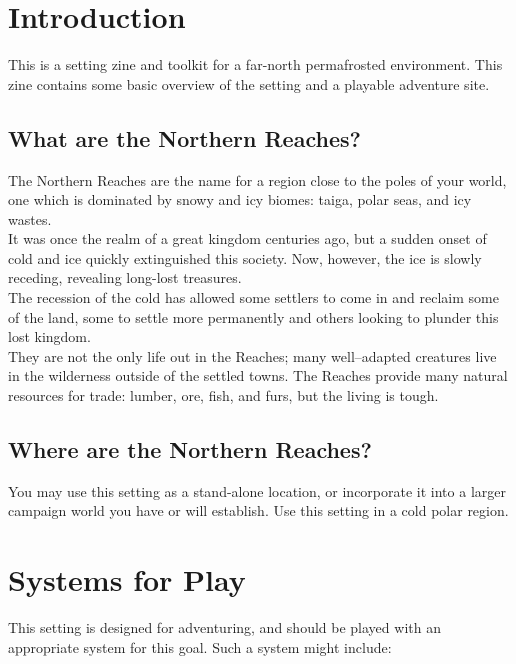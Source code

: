 \documentclass[notitlepage]{article}
\begin{document}
\begin{multicols}{2}
  
\section{Introduction}

This is a setting zine and toolkit for a far-north permafrosted environment. This zine contains some basic overview of the setting and a playable adventure site.

\subsection*{What are the Northern Reaches?}

The Northern Reaches are the name for a region close to the poles of your world, one which is dominated by snowy and icy biomes: taiga, polar seas, and icy wastes. \\

It was once the realm of a great kingdom centuries ago, but a sudden onset of cold and ice quickly extinguished this society.
Now, however, the ice is slowly receding, revealing long-lost treasures. \\

The recession of the cold has allowed some settlers to come in and reclaim some of the land, some to settle more permanently and others looking to plunder this lost kingdom. \\

They are not the only life out in the Reaches; many well--adapted creatures live in the wilderness outside of the settled towns.
The Reaches provide many natural resources for trade: lumber, ore, fish, and furs, but the living is tough.

\subsection*{Where are the Northern Reaches?}

You may use this setting as a stand-alone location, or incorporate it into a larger campaign world you have or will establish.
Use this setting in a cold polar region.

\section{Systems for Play}

This setting is designed for adventuring, and should be played with an appropriate system for this goal.
Such a system might include:


\end{multicols}
\end{document}
